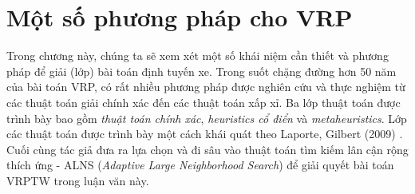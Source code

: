 \chapter{Một số phương pháp cho VRP}
\label{chap:solution}

Trong chương này, chúng ta sẽ xem xét một số khái niệm cần thiết và phương pháp để giải (lớp) bài toán định tuyến xe. Trong suốt chặng đường hơn 50 năm của bài toán VRP, có rất nhiều phương pháp được nghiên cứu và thực nghiệm từ các thuật toán giải chính xác đến các thuật toán xấp xỉ. Ba lớp thuật toán được trình bày bao gồm \textit{thuật toán chính xác}, \textit{heuristics cổ điển} và \textit{metaheuristics}. Lớp các thuật toán được trình bày một cách khái quát theo Laporte, Gilbert (2009) \cite{laporte2009fifty}. Cuối cùng tác giả đưa ra lựa chọn và đi sâu vào thuật toán tìm kiếm lân cận rộng thích ứng - ALNS (\textit{Adaptive Large Neighborhood Search}) để giải quyết bài toán VRPTW trong luận văn này.

